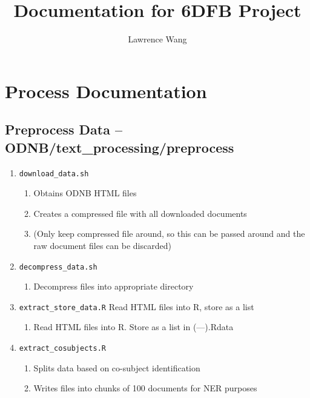 \documentclass[11pt]{article}
\newcommand{\filename}[1]{\texttt{#1}}
\begin{document}
\title{Documentation for 6DFB Project}
\author{Lawrence Wang}

\maketitle
\tableofcontents
\pagebreak

\section{Process Documentation}

\subsection{Preprocess Data -- ODNB/text\_processing/preprocess}

\begin{enumerate}
\item \filename{download\_data.sh}
\begin{enumerate}
\item Obtains ODNB HTML files
\item Creates a compressed file with all downloaded documents
\item (Only keep compressed file around, so this can be passed around and the raw document files can be discarded)
\end{enumerate}

\item \filename{decompress\_data.sh} 
\begin{enumerate}
\item Decompress files into appropriate directory
\end{enumerate}

\item \filename{extract\_store\_data.R}
Read HTML files into R, store as a list
\begin{enumerate}
\item Read HTML files into R. Store as a list in (---).Rdata
\end{enumerate}

\item \filename{extract\_cosubjects.R}
\begin{enumerate}
\item Splits data based on co-subject identification
\item Writes files into chunks of 100 documents for NER purposes
\end{enumerate}

\end{enumerate}
\end{document}
